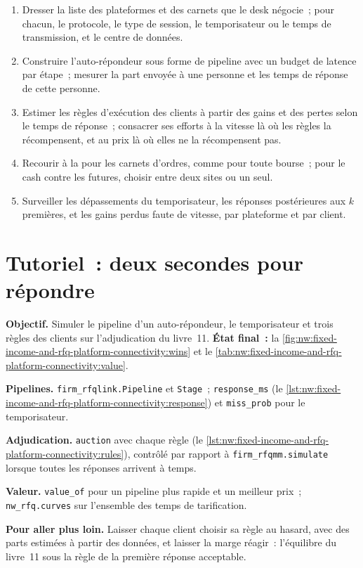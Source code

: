 \begin{method}\label{met:nw:fixed-income-and-rfq-platform-connectivity:desk}
\begin{enumerate}
\item Dresser la liste des plateformes et des carnets que le desk négocie~; pour chacun, le protocole, le type de session, le temporisateur ou le temps de transmission, et le centre de
  données.
\item Construire l'auto-répondeur sous forme de pipeline avec un budget de latence par étape~; mesurer la part envoyée à une personne et les temps de réponse
  de cette personne.
\item Estimer les règles d'exécution des clients à partir des gains et des pertes selon le temps de réponse~; consacrer ses efforts à la vitesse là où les règles la récompensent, et au prix
  là où elles ne la récompensent pas.
\item Recourir à la  pour les carnets d'ordres, comme pour toute bourse~; pour le cash contre les futures, choisir entre deux sites ou un seul.
\item Surveiller les dépassements du temporisateur, les réponses postérieures aux $k$ premières, et les gains perdus faute de vitesse, par plateforme et par client.
\end{enumerate}
\end{method}

\section{Tutoriel~: deux secondes pour répondre}\label{tut:nw:fixed-income-and-rfq-platform-connectivity:tut}

\begin{tutorial}
\textbf{Objectif.} Simuler le pipeline d'un auto-répondeur, le temporisateur et trois règles des clients sur l'adjudication du livre~11.
\textbf{État final~:} la \cref{fig:nw:fixed-income-and-rfq-platform-connectivity:wins} et
le \cref{tab:nw:fixed-income-and-rfq-platform-connectivity:value}.
\begin{tutsteps}
\item \textbf{Pipelines.} \texttt{firm\_rfqlink.Pipeline} et \texttt{Stage}~; \texttt{response\_ms}
  (le \cref{lst:nw:fixed-income-and-rfq-platform-connectivity:response}) et \texttt{miss\_prob} pour le temporisateur.
\item \textbf{Adjudication.} \texttt{auction} avec chaque règle (le \cref{lst:nw:fixed-income-and-rfq-platform-connectivity:rules}), contrôlé
  par rapport à \texttt{firm\_rfqmm.simulate} lorsque toutes les réponses arrivent à temps.
\item \textbf{Valeur.} \texttt{value\_of} pour un pipeline plus rapide et un meilleur prix~; \texttt{nw\_rfq.curves} sur l'ensemble des temps de tarification.
\end{tutsteps}
\textbf{Pour aller plus loin.} Laisser chaque client choisir sa règle au hasard, avec des parts estimées à partir des données, et laisser la marge réagir~:
l'équilibre du livre~11 sous la règle de la première réponse acceptable.
\end{tutorial}

